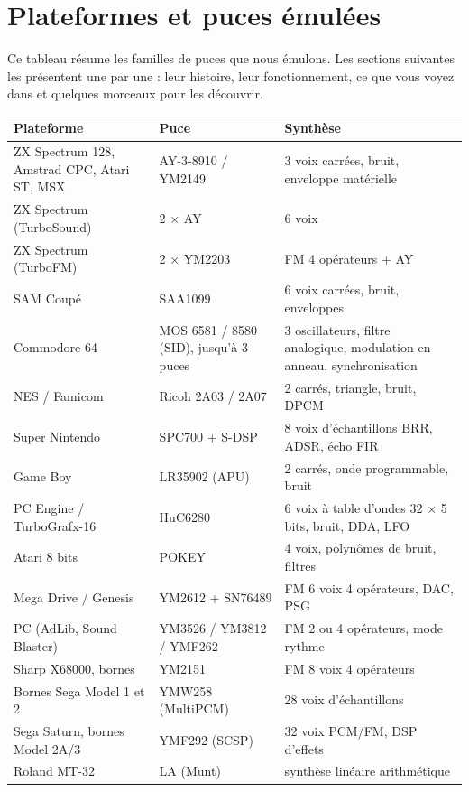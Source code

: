 \chapter{Plateformes et puces émulées}
Ce tableau résume les familles de puces que nous émulons. Les sections suivantes les présentent une par une : leur
histoire, leur fonctionnement, ce que vous voyez dans \soft et quelques morceaux pour les découvrir.



\begin{longtable}{@{}p{} p{} p{}@{}}
\toprule \textbf{Plateforme} & \textbf{Puce} & \textbf{Synthèse} \\ \midrule \endhead
ZX Spectrum 128, Amstrad CPC, Atari ST, MSX & AY-3-8910 / YM2149 & 3 voix carrées, bruit, enveloppe matérielle \\
ZX Spectrum (TurboSound) & 2 $\times$ AY & 6 voix \\
ZX Spectrum (TurboFM) & 2 $\times$ YM2203 & FM 4 opérateurs + AY \\
SAM Coupé & SAA1099 & 6 voix carrées, bruit, enveloppes \\
Commodore 64 & MOS 6581 / 8580 (SID), jusqu'à 3 puces & 3 oscillateurs, filtre analogique, modulation en anneau, synchronisation \\
NES / Famicom & Ricoh 2A03 / 2A07 & 2 carrés, triangle, bruit, DPCM \\
Super Nintendo & SPC700 + S-DSP & 8 voix d'échantillons BRR, ADSR, écho FIR \\
Game Boy & LR35902 (APU) & 2 carrés, onde programmable, bruit \\
PC Engine / TurboGrafx-16 & HuC6280 & 6 voix à table d'ondes 32 $\times$ 5 bits, bruit, DDA, LFO \\
Atari 8 bits & POKEY & 4 voix, polynômes de bruit, filtres \\
Mega Drive / Genesis & YM2612 + SN76489 & FM 6 voix 4 opérateurs, DAC, PSG \\
PC (AdLib, Sound Blaster) & YM3526 / YM3812 / YMF262 & FM 2 ou 4 opérateurs, mode rythme \\
Sharp X68000, bornes & YM2151 & FM 8 voix 4 opérateurs \\
Bornes Sega Model 1 et 2 & YMW258 (MultiPCM) & 28 voix d'échantillons \\
Sega Saturn, bornes Model 2A/3 & YMF292 (SCSP) & 32 voix PCM/FM, DSP d'effets \\
Roland MT-32 & LA (Munt) & synthèse linéaire arithmétique \\
\bottomrule
\end{longtable}

